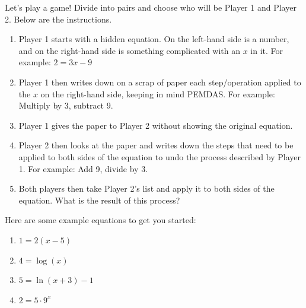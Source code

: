 \documentclass[noauthor]{ximera}
\begin{document}
\begin{problem}
Let's play a game! Divide into pairs and choose who will be
Player 1 and Player 2. Below are the instructions.

\begin{enumerate}
    \item Player 1 starts with a hidden equation. On the left-hand side
    is a number, and on the right-hand side is something complicated
    with an \(x\) in it. For example: \(2 = 3x - 9\)
    \item Player 1 then writes down on a scrap of paper each step/operation
    applied to the \(x\) on the right-hand side, keeping in mind PEMDAS.
    For example: Multiply by 3, subtract 9.
    \item Player 1 gives the paper to Player 2 without showing the original
    equation.
    \item Player 2 then looks at the paper and writes down the steps
    that need to be applied to both sides of the equation to undo
    the process described by Player 1. For example: Add 9, divide by 3.
    \item Both players then take Player 2's list and apply it to both sides
    of the equation. What is the result of this process?
\end{enumerate}

Here are some example equations to get you started:
\begin{enumerate}
    \item \(1 = 2(x - 5)\)
    \item \(4 = \log(x)\)
    \item \(5 = \ln(x + 3) - 1\)
    \item \(2 = 5 \cdot 9^x\) 
\end{enumerate}
\end{problem}
\end{document}
